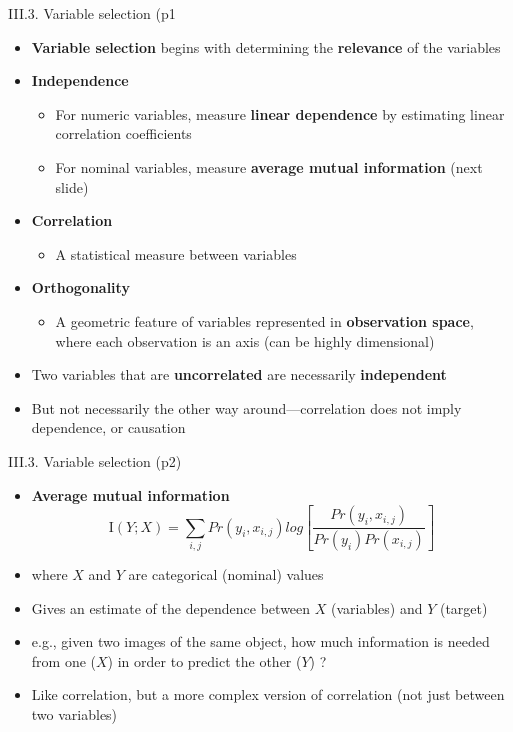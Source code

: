 \documentclass[handout]{beamer}
\newcommand{\strong}[1]{\textbf{\color{teal} #1}}
\newcommand{\stronger}[1]{\textbf{\color{purple} #1}}
\begin{document}
\begin{frame}{III.3. Variable selection (p1}
\begin{itemize}
\item \stronger{Variable selection} begins with determining the \strong{relevance} of the variables
\item \stronger{Independence}
	\begin{itemize}
	\item For numeric variables, measure \stronger{linear dependence} by estimating linear correlation coefficients
	\item For nominal variables, measure \stronger{average mutual information} (next slide)
	\end{itemize}
\item \stronger{Correlation}
	\begin{itemize}
	\item A statistical measure between variables
	\end{itemize}
\item \stronger{Orthogonality}
	\begin{itemize}
	\item A geometric feature of variables represented in \stronger{observation space}, where each observation is an axis (can be highly dimensional)
	\end{itemize}
\item Two variables that are \stronger{uncorrelated} are necessarily \stronger{independent}
\item But not necessarily the other way around---correlation does not imply dependence, or causation
\end{itemize}
\end{frame}
\begin{frame}{III.3. Variable selection (p2)}
\begin{itemize}
\item[] \stronger{Average mutual information}
\[
\mathrm{I}(Y;X) = \sum_{i,j}{ Pr(y_i,x_{i,j}) log \left[ \frac{Pr(y_i,x_{i,j})}{Pr(y_i) Pr(x_{i,j})}\right]}
\]
\item[] where $X$ and $Y$ are categorical (nominal) values
\item Gives an estimate of the dependence between $X$ (variables) and $Y$ (target)
\item e.g., given two images of the same object, how much information is needed from one ($X$) in order to predict the other ($Y$) ?
\item Like correlation, but a more complex version of correlation (not just between two variables)
\end{itemize}
\end{frame}
\end{document}

